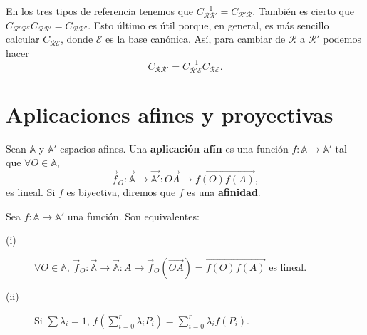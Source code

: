 \begin{observation}
En los tres tipos de referencia tenemos que $\displaystyle C^{-1}_{\mathcal{R}\mathcal{R}'} = C_{\mathcal{R}'\mathcal{R}} $. También es cierto que $\displaystyle C_{\mathcal{R}'\mathcal{R}''} C_{\mathcal{R}\mathcal{R}'} = C_{\mathcal{R}\mathcal{R}''} $. Esto último es útil porque, en general, es más sencillo calcular $\displaystyle C_{\mathcal{R}\mathcal{E}} $, donde $\displaystyle \mathcal{E} $ es la base canónica. Así, para cambiar de $\displaystyle \mathcal{R} $ a $\displaystyle \mathcal{R}' $ podemos hacer
\[C_{\mathcal{R}\mathcal{R}'} = C_{\mathcal{R}'\mathcal{E}}^{-1}C_{\mathcal{R}\mathcal{E}} .\]
\end{observation}
\section{Aplicaciones afines y proyectivas}
\begin{definition}
Sean $\displaystyle \mathbb{A} $ y $\displaystyle \mathbb{A}' $ espacios afines. Una \textbf{aplicación afín} es una función $\displaystyle f : \mathbb{A} \to \mathbb{A}' $ tal que $\displaystyle \forall O \in \mathbb{A} $,
\[\vec{f}_{O} : \vec{\mathbb{A}} \to \vec{\mathbb{A}'} : \overrightarrow{OA} \to \overrightarrow{f\left(O\right)f\left(A\right)} ,\]
es lineal. Si $\displaystyle f $ es biyectiva, diremos que $\displaystyle f $ es una \textbf{afinidad}.
\end{definition}
\begin{prop}
Sea $\displaystyle f : \mathbb{A} \to \mathbb{A}' $ una función. Son equivalentes:
\begin{description}
\item[(i)] $\displaystyle \forall O \in \mathbb{A} $, $\displaystyle \vec{f}_{O} : \vec{\mathbb{A}} \to \vec{\mathbb{A}} : A \to \vec{f}_{O}\left(\overrightarrow{OA}\right) = \overrightarrow{f\left(O\right)f\left(A\right)} $ es lineal.
\item[(ii)] Si $\displaystyle \sum \lambda_{i} = 1 $, $\displaystyle f\left(\sum^{r}_{i= 0}\lambda_{i}P_{i}\right) = \sum^{r}_{i= 0}\lambda_{i}f\left(P_{i}\right) $.
\end{description}
\end{prop}
